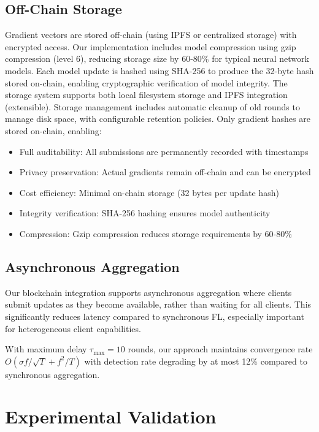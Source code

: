 \documentclass[runningheads]{llncs}
\begin{document}
\subsection{Off-Chain Storage}

Gradient vectors are stored off-chain (using IPFS or centralized storage) with encrypted access. Our implementation includes model compression using gzip compression (level 6), reducing storage size by 60-80\% for typical neural network models. Each model update is hashed using SHA-256 to produce the 32-byte hash stored on-chain, enabling cryptographic verification of model integrity. The storage system supports both local filesystem storage and IPFS integration (extensible). Storage management includes automatic cleanup of old rounds to manage disk space, with configurable retention policies. Only gradient hashes are stored on-chain, enabling:
\begin{itemize}
\item Full auditability: All submissions are permanently recorded with timestamps
\item Privacy preservation: Actual gradients remain off-chain and can be encrypted
\item Cost efficiency: Minimal on-chain storage (32 bytes per update hash)
\item Integrity verification: SHA-256 hashing ensures model authenticity
\item Compression: Gzip compression reduces storage requirements by 60-80\%
\end{itemize}

\subsection{Asynchronous Aggregation}

Our blockchain integration supports asynchronous aggregation where clients submit updates as they become available, rather than waiting for all clients. This significantly reduces latency compared to synchronous FL, especially important for heterogeneous client capabilities.

\begin{theorem}
With maximum delay $\tau_{\text{max}} = 10$ rounds, our approach maintains convergence rate $O(\sigma f/\sqrt{T} + f^2/T)$ with detection rate degrading by at most 12\% compared to synchronous aggregation.
\end{theorem}

\section{Experimental Validation}
\end{document}
